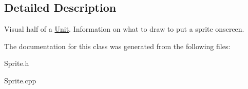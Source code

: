 \subsection{Detailed Description}
Visual half of a \hyperlink{class_unit}{Unit}. Information on what to draw to put a sprite onscreen. 

The documentation for this class was generated from the following files\+:\begin{DoxyCompactItemize}
\item 
Sprite.\+h\item 
Sprite.\+cpp\end{DoxyCompactItemize}
